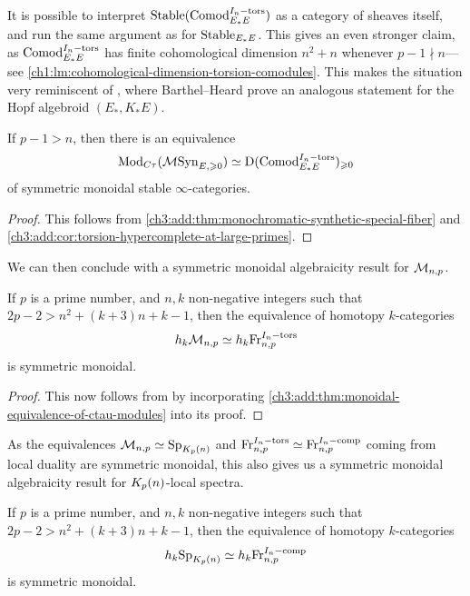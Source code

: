 \begin{remark}
    It is possible to interpret $\mathrm{Stable}(\mathrm{Comod}_{E_*E}^{I_n-\mathrm{tors}})$ as a category of sheaves itself, and run the same argument as for $\mathrm{Stable}_{E_*E}$. This gives an even stronger claim, as $\mathrm{Comod}_{E_*E}^{I_n-\mathrm{tors}}$ has finite cohomological dimension $n^2+n$ whenever $p-1\nmid n$---see \cref{ch1:lm:cohomological-dimension-torsion-comodules}. This makes the situation very reminiscent of \cite[4.7]{barthel-heard_2018}, where Barthel--Heard prove an analogous statement for the Hopf algebroid $(E_*, K_*E)$. 
\end{remark}

\begin{theorem}
    \label{ch3:add:thm:monoidal-equivalence-of-ctau-modules}
    If $p-1>n$, then there is an equivalence 
    \[\mathrm{Mod}_{C\tau}(\mathcal{M}\mathrm{Syn}_{E, \geqslant 0}) \simeq \mathrm{D}(\mathrm{Comod}_{E_*E}^{I_n-\mathrm{tors}})_{\geqslant 0}\]
    of symmetric monoidal stable $\infty$-categories. 
\end{theorem}
\begin{proof}
    This follows from \cref{ch3:add:thm:monochromatic-synthetic-special-fiber} and \cref{ch3:add:cor:torsion-hypercomplete-at-large-primes}. 
\end{proof}

We can then conclude with a symmetric monoidal algebraicity result for $\mathcal{M}_{n,p}$. 

\begin{theorem}
    \label{ch3:add:thm:monochromatic-monoidally-algebraic}
    If $p$ is a prime number, and $n, k$ non-negative integers such that $2p-2>n^2+(k+3)n+k-1$, then the equivalence of homotopy $k$-categories
    \[h_k \mathcal{M}_{n,p}\simeq h_k \mathrm{Fr}_{n,p}^{I_n-\mathrm{tors}}\]
    is symmetric monoidal. 
\end{theorem}
\begin{proof}
    This now follows from \cite[Theorem H]{barkan_2023} by incorporating \cref{ch3:add:thm:monoidal-equivalence-of-ctau-modules} into its proof. 
\end{proof}


As the equivalences $\mathcal{M}_{n,p} \simeq \mathrm{Sp}_{K_p(n)}$ and $\mathrm{Fr}_{n,p}^{I_n-\mathrm{tors}} \simeq \mathrm{Fr}_{n,p}^{I_n-\mathrm{comp}}$ coming from local duality are symmetric monoidal, this also gives us a symmetric monoidal algebraicity result for ${K_p(n)}$-local spectra. 

\begin{corollary}
    If $p$ is a prime number, and $n, k$ non-negative integers such that $2p-2>n^2+(k+3)n+k-1$, then the equivalence of homotopy $k$-categories
    \[h_k \mathrm{Sp}_{K_p(n)}\simeq h_k \mathrm{Fr}_{n,p}^{I_n-\mathrm{comp}}\]
    is symmetric monoidal. 
\end{corollary}
